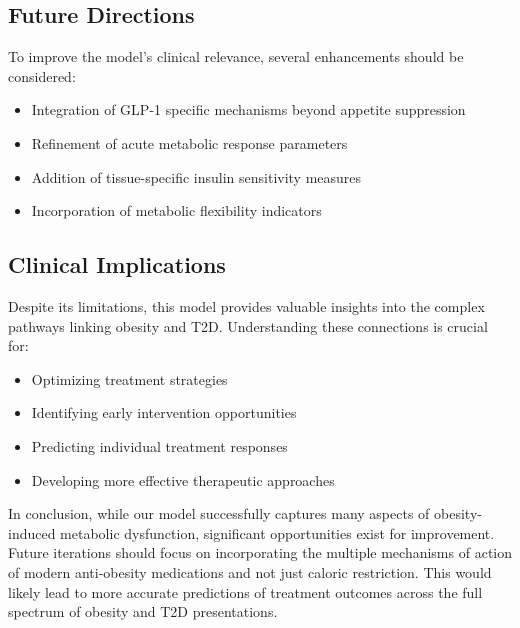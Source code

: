 \begin{multicols}{2}
\subsection{Future Directions}
To improve the model's clinical relevance, several enhancements should be considered:
\begin{itemize}
    \item Integration of GLP-1 specific mechanisms beyond appetite suppression
    \item Refinement of acute metabolic response parameters
    \item Addition of tissue-specific insulin sensitivity measures
    \item Incorporation of metabolic flexibility indicators
\end{itemize}

\subsection{Clinical Implications}
Despite its limitations, this model provides valuable insights into the complex pathways linking obesity and T2D. Understanding these connections is crucial for:
\begin{itemize}
    \item Optimizing treatment strategies
    \item Identifying early intervention opportunities
    \item Predicting individual treatment responses
    \item Developing more effective therapeutic approaches
\end{itemize}

In conclusion, while our model successfully captures many aspects of obesity-induced metabolic dysfunction, significant opportunities exist for improvement. Future iterations should focus on incorporating the multiple mechanisms of action of modern anti-obesity medications and not just caloric restriction. This would likely lead to more accurate predictions of treatment outcomes across the full spectrum of obesity and T2D presentations.
\end{multicols}